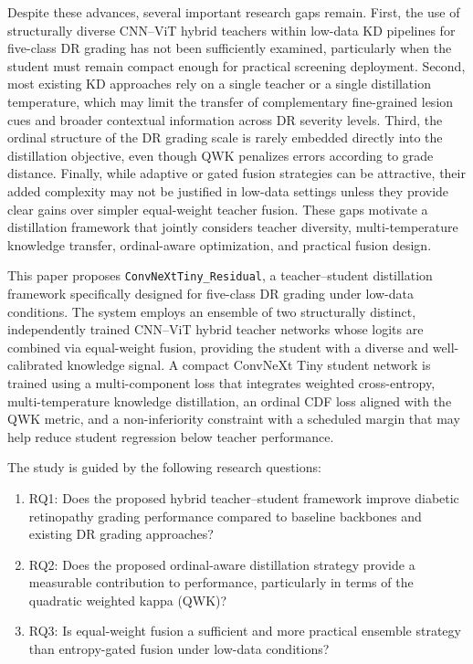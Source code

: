 \documentclass[a4paper,fleqn]{cas-dc}
\begin{document}
Despite these advances, several important research gaps remain. First, the use of structurally diverse CNN--ViT hybrid teachers within low-data KD pipelines for five-class DR grading has not been sufficiently examined, particularly when the student must remain compact enough for practical screening deployment. Second, most existing KD approaches rely on a single teacher or a single distillation temperature, which may limit the transfer of complementary fine-grained lesion cues and broader contextual information across DR severity levels. Third, the ordinal structure of the DR grading scale is rarely embedded directly into the distillation objective, even though QWK penalizes errors according to grade distance. Finally, while adaptive or gated fusion strategies can be attractive, their added complexity may not be justified in low-data settings unless they provide clear gains over simpler equal-weight teacher fusion. These gaps motivate a distillation framework that jointly considers teacher diversity, multi-temperature knowledge transfer, ordinal-aware optimization, and practical fusion design.

This paper proposes \texttt{ConvNeXtTiny\_Residual}, a teacher--student distillation framework specifically designed for five-class DR grading under low-data conditions. The system employs an ensemble of two structurally distinct, independently trained CNN--ViT hybrid teacher networks whose logits are combined via equal-weight fusion, providing the student with a diverse and well-calibrated knowledge signal. A compact ConvNeXt Tiny \cite{liu2022} student network is trained using a multi-component loss that integrates weighted cross-entropy, multi-temperature knowledge distillation, an ordinal CDF loss aligned with the QWK metric, and a non-inferiority constraint with a scheduled margin that may help reduce student regression below teacher performance.

The study is guided by the following research questions:

\begin{enumerate}
    \item RQ1: Does the proposed hybrid teacher--student framework improve diabetic retinopathy grading performance compared to baseline backbones and existing DR grading approaches?
    \item RQ2: Does the proposed ordinal-aware distillation strategy provide a measurable contribution to performance, particularly in terms of the quadratic weighted kappa (QWK)?
    \item RQ3: Is equal-weight fusion a sufficient and more practical ensemble strategy than entropy-gated fusion under low-data conditions?
\end{enumerate}
\end{document}
